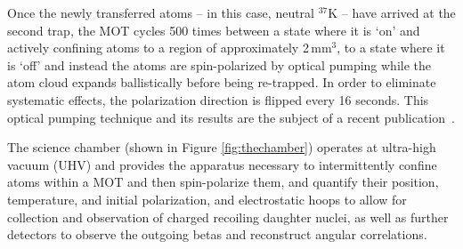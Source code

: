 Once the newly transferred atoms -- in this case, neutral $^{37}\textrm{K}$ -- have arrived at the second trap, the MOT cycles 500 times between a state where it is `on' and actively confining atoms to a region of approximately 2\,mm$^3$, to a state where it is `off' and instead the atoms are spin-polarized by optical pumping while the atom cloud expands ballistically before being re-trapped.  In order to eliminate systematic effects, the polarization direction is flipped every 16 seconds.  This optical pumping technique and its results are the subject of a recent publication~\cite{ben_OP}.

The science chamber (shown in Figure \ref{fig:thechamber}) operates at ultra-high vacuum (UHV) and provides the apparatus necessary to intermittently confine atoms within a MOT and then spin-polarize them, and quantify their position, temperature, and initial polarization, and electrostatic hoops to allow for collection and observation of charged recoiling daughter nuclei, as well as further detectors to observe the outgoing betas and reconstruct angular correlations.  

